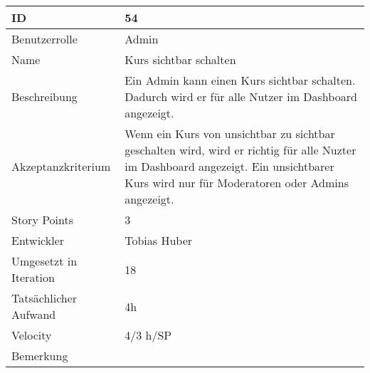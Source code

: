 \begin{tabularx}{\textwidth}{|p{}|X|}
	\hline
	ID & 54\\
	\hline
	Benutzerrolle & Admin\\
	\hline
	Name & Kurs sichtbar schalten\\
	\hline
	Beschreibung & Ein Admin kann einen Kurs sichtbar schalten. Dadurch wird er für alle Nutzer im Dashboard angezeigt.\\
	\hline
	Akzeptanzkriterium & Wenn ein Kurs von unsichtbar zu sichtbar geschalten wird, wird er richtig für alle Nuzter im Dashboard angezeigt. Ein unsichtbarer Kurs wird nur für Moderatoren oder Admins angezeigt.\\
	\hline
	Story Points & 3\\
	\hline
	Entwickler & Tobias Huber\\
	\hline
	Umgesetzt in Iteration & 18\\
	\hline
	Tatsächlicher Aufwand & 4h\\
	\hline
	Velocity & 4/3 h/SP\\
	\hline
	Bemerkung & \\
	\hline
\end{tabularx}
\vspace{20pt}
